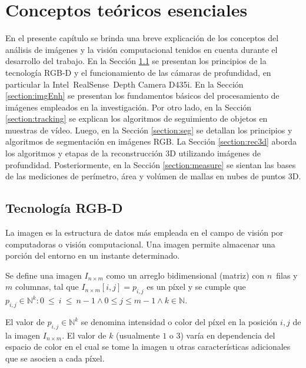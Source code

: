 \chapter{Conceptos teóricos esenciales}\label{chapter:theoretical-framework}


En el presente capítulo se brinda una breve explicación de los conceptos del análisis de imágenes y la visión computacional tenidos en cuenta durante el desarrollo del trabajo. En la Sección \ref{section:rgbd} se presentan los principios de la tecnología RGB-D y el funcionamiento de las cámaras de profundidad, en particular la Intel\textregistered~RealSense\texttrademark~Depth Camera D435i. En la Sección \ref{section:imgEnh} se presentan los fundamentos básicos del procesamiento de imágenes empleados en la investigación. Por otro lado, en la Sección \ref{section:tracking} se explican los algoritmos de seguimiento de objetos en muestras de vídeo. Luego, en la Sección \ref{section:seg} se detallan los principios y algoritmos de segmentación en imágenes RGB. La Sección \ref{section:rec3d} aborda los algoritmos y etapas de la reconstrucción 3D utilizando imágenes de profundidad. Posteriormente, en la Sección \ref{section:measure} se sientan las bases de las mediciones de perímetro, área y volúmen de mallas en nubes de puntos 3D.

\section{Tecnología RGB-D}\label{section:rgbd}

La imagen es la estructura de datos más empleada en el campo de visión por computadoras o visión computacional. Una imagen permite almacenar una porción del entorno en un instante determinado.

\begin{definition}\label{def:img}
	Se define una imagen $I_{n \times m}$ como un arreglo bidimensional (matriz) con $n$~filas y $m$ columnas, tal que $I_{n \times m}[i, j] = p_{i,j}$ es un píxel y se cumple que $p_{i, j} \in \mathbb{N}^k: 0~\leq~i~\leq~n - 1 \wedge 0 \leq j \leq m - 1 \wedge k \in \mathbb{N}$.
\end{definition}

\begin{definition}
	El valor de $p_{i, j} \in \mathbb{N}^k$ se denomina intensidad o color del píxel en la posición $i, j$ de la imagen $I_{n \times m}$. El valor de $k$ (usualmente $1$ o $3$) varía en dependencia del espacio de color en el cual se tome la imagen u otras características adicionales que se asocien a cada píxel.
\end{definition}

